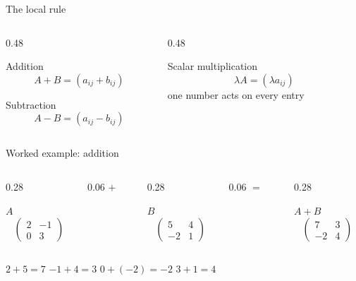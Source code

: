 \begin{frame}{The local rule}
  \begin{columns}[T,onlytextwidth]
    \begin{column}{0.48\textwidth}
      \begin{block}{Addition}
        \[
        A+B=(a_{ij}+b_{ij})
        \]
      \end{block}
      \begin{block}{Subtraction}
        \[
        A-B=(a_{ij}-b_{ij})
        \]
      \end{block}
    \end{column}
    \begin{column}{0.48\textwidth}
      \begin{exampleblock}{Scalar multiplication}
        \[
        \lambda A=(\lambda a_{ij})
        \]
        one number acts on every entry
      \end{exampleblock}
    \end{column}
  \end{columns}
\end{frame}

\begin{frame}{Worked example: addition}
  \begin{columns}[T,onlytextwidth]
    \begin{column}{0.28\textwidth}
      \begin{block}{$A$}
        \[
        \begin{pmatrix}2&-1\\0&3\end{pmatrix}
        \]
      \end{block}
    \end{column}
    \begin{column}{0.06\textwidth}
      \centering\vspace{0.65cm}\Huge $+$
    \end{column}
    \begin{column}{0.28\textwidth}
      \begin{block}{$B$}
        \[
        \begin{pmatrix}5&4\\-2&1\end{pmatrix}
        \]
      \end{block}
    \end{column}
    \begin{column}{0.06\textwidth}
      \centering\vspace{0.65cm}\Huge $=$
    \end{column}
    \begin{column}{0.28\textwidth}
      \begin{exampleblock}{$A+B$}
        \[
        \begin{pmatrix}7&3\\-2&4\end{pmatrix}
        \]
      \end{exampleblock}
    \end{column}
  \end{columns}

  \vspace{0.65cm}
  \centering
  $2+5=7$ \quad $-1+4=3$ \quad $0+(-2)=-2$ \quad $3+1=4$
\end{frame}
